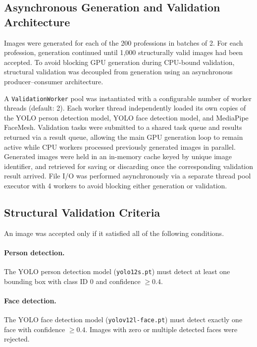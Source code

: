 \subsection{Asynchronous Generation and Validation Architecture}

Images were generated for each of the 200 professions in batches of 2. For each profession, generation continued until 1{,}000 structurally valid images had been accepted. To avoid blocking GPU generation during CPU-bound validation, structural validation was decoupled from generation using an asynchronous producer--consumer architecture.

A \texttt{ValidationWorker} pool was instantiated with a configurable number of worker threads (default: 2). Each worker thread independently loaded its own copies of the YOLO person detection model, YOLO face detection model, and MediaPipe FaceMesh. Validation tasks were submitted to a shared task queue and results returned via a result queue, allowing the main GPU generation loop to remain active while CPU workers processed previously generated images in parallel. Generated images were held in an in-memory cache keyed by unique image identifier, and retrieved for saving or discarding once the corresponding validation result arrived. File I/O was performed asynchronously via a separate thread pool executor with 4 workers to avoid blocking either generation or validation.

\subsection{Structural Validation Criteria}

An image was accepted only if it satisfied all of the following conditions.

\paragraph{Person detection.} The YOLO person detection model (\texttt{yolo12s.pt}) must detect at least one bounding box with class ID 0 and confidence $\geq 0.4$.

\paragraph{Face detection.} The YOLO face detection model (\texttt{yolov12l-face.pt}) must detect exactly one face with confidence $\geq 0.4$. Images with zero or multiple detected faces were rejected.

